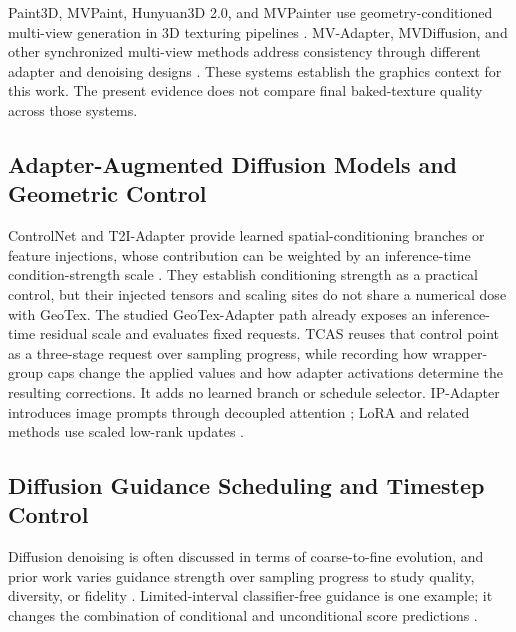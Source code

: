 \documentclass[times,twocolumn,final]{elsarticle}
\begin{document}
Paint3D, MVPaint, Hunyuan3D 2.0, and MVPainter use geometry-conditioned multi-view generation in 3D texturing pipelines \cite{zeng2024paint3d,cheng2024mvpaint,lai2025hunyuan3d,shao2025mvpainter}. MV-Adapter, MVDiffusion, and other synchronized multi-view methods address consistency through different adapter and denoising designs \cite{huang2024mvadapter,tang2023mvdiffusion,liu2024synchronized,xu2026wondertex}. These systems establish the graphics context for this work. The present evidence does not compare final baked-texture quality across those systems.

\subsection{Adapter-Augmented Diffusion Models and Geometric Control}
\label{subsec:adapter}

ControlNet and T2I-Adapter provide learned spatial-conditioning branches or feature injections, whose contribution can be weighted by an inference-time condition-strength scale \cite{mou2023t2iadapter,zhang2023controlnet}. They establish conditioning strength as a practical control, but their injected tensors and scaling sites do not share a numerical dose with GeoTex. The studied GeoTex-Adapter path already exposes an inference-time residual scale and evaluates fixed requests. TCAS reuses that control point as a three-stage request over sampling progress, while recording how wrapper-group caps change the applied values and how adapter activations determine the resulting corrections. It adds no learned branch or schedule selector. IP-Adapter introduces image prompts through decoupled attention \cite{ye2023ipadapter}; LoRA and related methods use scaled low-rank updates \cite{hu2022lora,liu2024dora,zhang2023adalora}.

\subsection{Diffusion Guidance Scheduling and Timestep Control}
\label{subsec:guidance}

Diffusion denoising is often discussed in terms of coarse-to-fine evolution, and prior work varies guidance strength over sampling progress to study quality, diversity, or fidelity \cite{ho2020ddpm,song2021ddim,ho2022cfg,castillo2023adaptive}. Limited-interval classifier-free guidance is one example; it changes the combination of conditional and unconditional score predictions \cite{kynkanniemi2024limited}.
\end{document}
